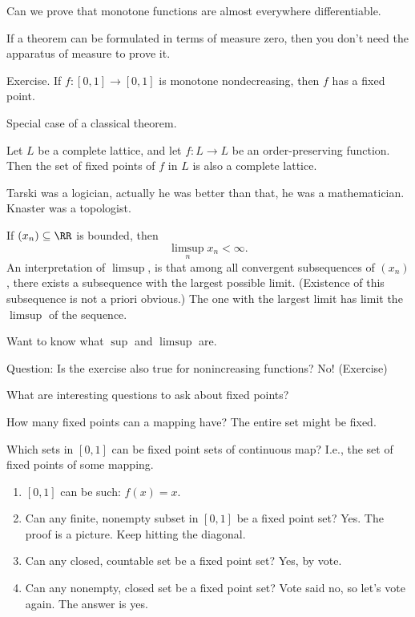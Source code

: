 \documentclass{article}
\begin{document}
Can we prove that monotone functions are almost everywhere 
differentiable.

If a theorem can be formulated in terms of measure zero,
then you don't need the apparatus of measure to prove it.

Exercise. If $f:[0,1]\to [0,1]$ is monotone nondecreasing,
then $f$ has a fixed point. 

Special case of a classical theorem.

\begin{theorem}
    Let $L$ be a complete lattice, and let $f:L\to L$ be an
    order-preserving function. Then the set of fixed points of 
    $f$ in $L$ is also a complete lattice.
\end{theorem}

Tarski was a logician, actually he was better than that, he was a
mathematician. Knaster was a topologist.

If $(x_n)\subseteq \RR$ is bounded, then
\[ \limsup_n x_n < \infty. \]
An interpretation of $\limsup$, is that among all convergent
subsequences of $(x_n)$, there exists a subsequence with the 
largest possible limit. (Existence of this subsequence 
is not a priori obvious.)
The one with the largest limit has limit the
$\limsup$ of the sequence.

Want to know what $\sup$ and $\limsup$ are.

Question: Is the exercise also true for nonincreasing functions?
No! (Exercise)

What are interesting questions to ask about fixed points?

How many fixed points can a mapping have? The entire set might be
fixed.

Which sets in $[0,1]$ can be fixed point sets of continuous map?
I.e., the set of
fixed points of some mapping.

\begin{enumerate}[1.]
    \item $[0,1]$ can be such: $f(x)=x$.
    \item Can any finite, nonempty 
        subset in $[0,1]$ be a fixed point set?
        Yes. The proof is a picture. Keep hitting the diagonal.
    \item Can any closed, countable set be a fixed point set?
        Yes, by vote. 
    \item Can any nonempty, closed set be a fixed point set?
        Vote said no, so let's vote again. The answer is yes.
\end{enumerate}
\end{document}
